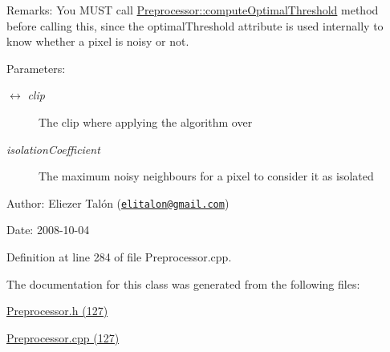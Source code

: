 \begin{Desc}
\item[Remarks:]You MUST call \hyperlink{class_preprocessor_2fbe202fbf9e7ef8f9951a24a3156230}{Preprocessor::computeOptimalThreshold} method before calling this, since the optimalThreshold attribute is used internally to know whether a pixel is noisy or not.\end{Desc}
\begin{Desc}
\item[Parameters:]
\begin{description}
\item[\mbox{$\leftrightarrow$} {\em clip}]The clip where applying the algorithm over \item[{\em isolationCoefficient}]The maximum noisy neighbours for a pixel to consider it as isolated\end{description}
\end{Desc}
\begin{Desc}
\item[Author:]Eliezer Talón (\href{mailto:elitalon@gmail.com}{\tt elitalon@gmail.com}) \end{Desc}
\begin{Desc}
\item[Date:]2008-10-04 \end{Desc}


Definition at line 284 of file Preprocessor.cpp.

The documentation for this class was generated from the following files:\begin{CompactItemize}
\item 
\hyperlink{_preprocessor_8h}{Preprocessor.h (127)}\item 
\hyperlink{_preprocessor_8cpp}{Preprocessor.cpp (127)}\end{CompactItemize}
